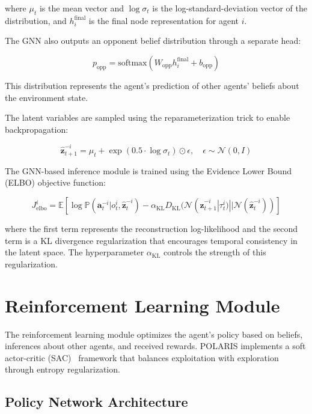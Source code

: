 \documentclass[a4paper,12pt]{report}
\begin{document}
where $\mu_{t}$ is the mean vector and $\log\sigma_{t}$ is the log-standard-deviation vector of the distribution, and $h^{\text{final}}_i$ is the final node representation for agent $i$.

The GNN also outputs an opponent belief distribution through a separate head:

\begin{equation}
    p_{\text{opp}} = \text{softmax}(W_{\text{opp}}h^{\text{final}}_i + b_{\text{opp}})
\end{equation}

This distribution represents the agent's prediction of other agents' beliefs about the environment state.

The latent variables are sampled using the reparameterization trick to enable backpropagation:

\begin{equation}
    \hat{\boldsymbol{z}}^{-i}_{t+1} = \mu_{t} + \exp(0.5 \cdot \log\sigma_{t}) \odot \epsilon, \quad \epsilon \sim \mathcal{N}(0, I)
\end{equation}

The GNN-based inference module is trained using the Evidence Lower Bound (ELBO) objective function:

\begin{equation}
    J^{i}_{\text{elbo}} = \mathbb{E}[\log \mathbb{P}(\boldsymbol{a}^{-i}_{t}|o^{i}_{t}, \hat{\boldsymbol{z}}^{-i}_{t}) - \alpha_{\text{KL}}D_{\text{KL}}(\mathcal{N}(\hat{\boldsymbol{z}}^{-i}_{t+1}|\tau^i_t) || \mathcal{N}(\hat{\boldsymbol{z}}^{-i}_{t}))]
\end{equation}

where the first term represents the reconstruction log-likelihood and the second term is a KL divergence regularization that encourages temporal consistency in the latent space. The hyperparameter $\alpha_{\text{KL}}$ controls the strength of this regularization.


\section{Reinforcement Learning Module}

The reinforcement learning module optimizes the agent's policy based on beliefs, inferences about other agents, and received rewards. POLARIS implements a soft actor-critic (SAC)~\cite{haarnoja2018soft} framework that balances exploitation with exploration through entropy regularization.

\subsection{Policy Network Architecture}
\end{document}
